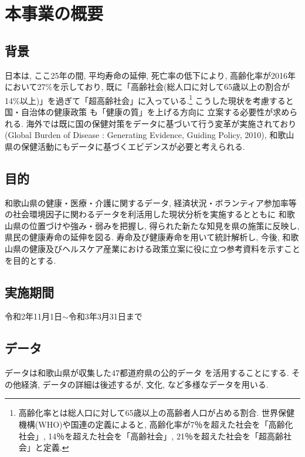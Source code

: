 



\chapter{本事業の概要}
\section{背景}
日本は, ここ25年の間, 平均寿命の延伸, 死亡率の低下により, 高齢化率が2016年において27\%を示しており, 既に「高齢社会(総人口に対して65歳以上の割合が14\%以上)」を過ぎて「超高齢社会」に入っている.\footnote{
	高齢化率とは総人口に対して65歳以上の高齢者人口が占める割合. 世界保健機構(WHO)や国連の定義によると, 高齢化率が7％を超えた社会を「高齢化社会」, 14％を超えた社会を「高齢社会」, 21％を超えた社会を「超高齢社会」と定義.
}
こうした現状を考慮すると
国・自治体の健康政策
も「健康の質」を上げる方向に
立案する必要性が求められる.
海外では既に国の保健対策をデータに基づいて行う変革が実施されており(Global Burden of Disease :  Generating Evidence, Guiding Policy, 2010),
和歌山県の保健活動にもデータに基づくエビデンスが必要と考えられる.



\section{目的}
和歌山県の健康・医療・介護に関するデータ, 経済状況・ボランティア参加率等の社会環境因子に関わるデータを利活用した現状分析を実施するとともに
和歌山県の位置づけや強み・弱みを把握し,
得られた新たな知見を県の施策に反映し, 県民の健康寿命の延伸を図る.
寿命及び健康寿命を用いて統計解析し,
 今後, 和歌山県の健康及びヘルスケア産業における政策立案に役に立つ参考資料を示すことを目的とする.

\section{実施期間}
令和2年11月1日$\sim$令和3年3月31日まで


\section{データ}
データは和歌山県が収集した47都道府県の公的データ
を活用することにする.
その他経済, データの詳細は後述するが,
文化, など多様なデータを用いる.


